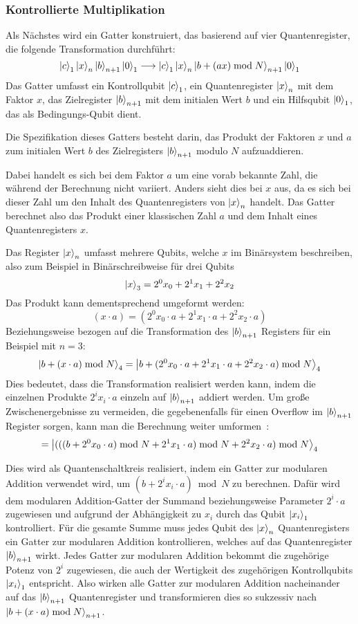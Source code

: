 \subsubsection{Kontrollierte Multiplikation}
Als Nächstes wird ein Gatter konstruiert, 
das basierend auf vier Quantenregister,
die folgende Transformation durchführt: 
\[\ket{c}_1\ket{x}_{n}\ket{b}_{n+1}\ket{0}_1
\longrightarrow
\ket{c}_1\ket{x}_{n}\ket{b + (ax)\bmod N}_{n+1}\ket{0}_1\]
Das Gatter umfasst ein Kontrollqubit \(\ket{c}_1\), 
ein Quantenregister \(\ket{x}_{n}\) mit dem Faktor \(x\),
das Zielregister \(\ket{b}_{n+1}\) mit dem initialen Wert \(b\) und 
ein Hilfsqubit \(\ket{0}_1\), das als Bedingungs-Qubit dient.

Die Spezifikation dieses Gatters besteht darin, 
das Produkt der Faktoren \(x\) und \(a\) 
zum initialen Wert \(b\) des Zielregisters \(\ket{b}_{n+1}\) modulo \(N\) aufzuaddieren.

Dabei handelt es sich bei dem Faktor \(a\) um eine vorab bekannte Zahl, 
die während der Berechnung nicht variiert.
Anders sieht dies bei \(x\) aus, da es sich bei dieser Zahl um den Inhalt des Quantenregisters von \(\ket{x}_{n}\) handelt.
Das Gatter berechnet also das Produkt einer klassischen Zahl \(a\) und dem Inhalt eines Quantenregisters \(x\).

Das Register \(\ket{x}_{n}\) umfasst mehrere Qubits, 
welche \(x\) im Binärsystem beschreiben, 
also zum Beispiel in Binärschreibweise für drei Qubits 
\[\ket{x}_{3} = 2^0x_0+2^1x_1+2^2x_2\]
Das Produkt kann dementsprechend umgeformt werden: 
\[(x\cdot a)  = (2^0x_0\cdot a+2^1x_1\cdot a+2^2x_2\cdot a) \]
Beziehungsweise bezogen auf die Transformation des \(\ket{b}_{n+1}\) Registers für ein Beispiel mit \(n=3\):
\[\ket{b + (x\cdot a) \bmod N}_{4} = \ket{b + (2^0x_0\cdot a+2^1x_1\cdot a+2^2x_2\cdot a) \bmod N}_{4}\]
Dies bedeutet, dass die Transformation realisiert werden kann, 
indem die einzelnen Produkte \(2^ix_i\cdot a\) einzeln auf \(\ket{b}_{n+1}\) addiert werden.
Um große Zwischenergebnisse zu vermeiden, die gegebenenfalls für einen Overflow im \(\ket{b}_{n+1}\) Register sorgen, 
kann man die Berechnung weiter umformen~\cite{beauregard2003circuit}:
\[= \ket{(((b + 2^0x_0\cdot a)\bmod N+2^1x_1\cdot a)\bmod N+2^2x_2\cdot a) \bmod N}_{4}\]

Dies wird als Quantenschaltkreis realisiert, 
indem ein Gatter zur modularen Addition verwendet wird, 
um \((b + 2^ix_i\cdot a)\bmod N\) zu berechnen.
Dafür wird dem modularen Addition-Gatter der Summand beziehungsweise Parameter \(2^i\cdot a\) zugewiesen 
und aufgrund der Abhängigkeit zu \(x_i\) durch das Qubit \(\ket{x_i}_1\) kontrolliert.
Für die gesamte Summe muss jedes Qubit des \(\ket{x}_{n}\) Quantenregisters ein Gatter zur modularen Addition kontrollieren, 
welches auf das Quantenregister \(\ket{b}_{n+1}\) wirkt.
Jedes Gatter zur modularen Addition bekommt die zugehörige Potenz von \(2^i\) zugewiesen, 
die auch der Wertigkeit des zugehörigen Kontrollqubits \(\ket{x_i}_1\) entspricht.
Also wirken alle Gatter zur modularen Addition nacheinander auf das \(\ket{b}_{n+1}\) Quantenregister und 
transformieren dies so sukzessiv nach \(\ket{b + (x\cdot a) \bmod N}_{n+1}\).

